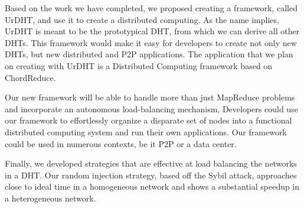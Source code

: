 Based on the work we have completed, we proposed creating a framework, called UrDHT, and use it to create a distributed computing. 
As the name implies, UrDHT is meant to be the prototypical DHT, from which we can derive all other DHTs.
This framework would make it easy for developers to create not only new DHTs, but new distributed and P2P applications.
The application that we plan on creating with UrDHT is a Distributed Computing framework based on ChordReduce.

Our new framework will be able to handle more than just MapReduce problems and incorporate an autonomous load-balancing mechanism,
Developers could use our framework to effortlessly organize a disparate set of nodes into a functional distributed computing system and run their own applications.
Our framework could be used in numerous contexts, be it P2P or a data center.

Finally, we developed strategies that are effective at load balancing the networks in a DHT.
Our random injection strategy, based off the Sybil attack, approaches close to ideal time in a homogeneous network and shows a substantial speedup in a heterogeneous network.